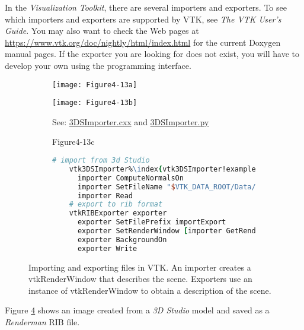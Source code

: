 In the \emph{Visualization Toolkit}, there are several importers and exporters. To see which importers and exporters are supported by VTK, see \emph{The VTK User's Guide}. You may also want to check the Web pages at \href{https://www.vtk.org/doc/nightly/html/index.html}{https://www.vtk.org/doc/nightly/html/index.html} for the current Doxygen manual pages. If the exporter you are looking for does not exist, you will have to develop your own using the programming interface.

\begin{figure}[htb]
  \begin{subfigure}[h]{0.48\linewidth}
    \texttt{[image: Figure4-13a]}
    \caption*{}
    \label{fig:Figure4-13a}
  \end{subfigure}
  \hfill
  \begin{subfigure}[h]{0.48\linewidth}
    \texttt{[image: Figure4-13b]}
    \caption*{See:  \href{https://lorensen.github.io/VTKExamples/site/Cxx/IO/3DSImporter/}{3DSImporter.cxx} and \href{https://lorensen.github.io/VTKExamples/site/Python/IO/3DSImporter/}{3DSImporter.py}}
    \label{fig:Figure4-13b}
  \end{subfigure}
  \hfill
  \begin{subfigure}[h]{0.96\linewidth}{Figure4-13c}
  \begin{lstlisting}[language=TCL,  caption={}, numbers=none, frame=none, escapechar=\%]
    # import from 3d Studio
    vtk3DSImporter%\index{vtk3DSImporter!example}% importer
      importer ComputeNormalsOn
      importer SetFileName "$VTK_DATA_ROOT/Data/iflamigm.3ds"
      importer Read
    # export to rib format
    vtkRIBExporter exporter
      exporter SetFilePrefix importExport
      exporter SetRenderWindow [importer GetRenderWindow]
      exporter BackgroundOn
      exporter Write
    \end{lstlisting} 
    \caption*{}
    \label{fig:Figure4-13c}
  \end{subfigure}
  \caption{Importing and exporting files in VTK. An importer creates a vtkRenderWindow that describes the scene. Exporters use an instance of vtkRenderWindow to obtain a description of the scene.}\label{fig:Figure4-13}
\end{figure}

Figure \ref{fig:Figure4-13} shows an image created from a \emph{3D Studio} model and saved as a \emph{Renderman} RIB file.

